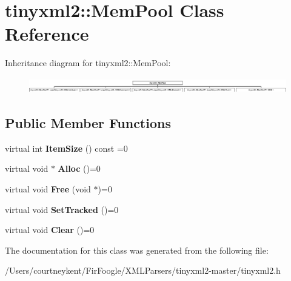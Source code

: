 \hypertarget{classtinyxml2_1_1_mem_pool}{\section{tinyxml2\+:\+:Mem\+Pool Class Reference}
\label{classtinyxml2_1_1_mem_pool}
}
Inheritance diagram for tinyxml2\+:\+:Mem\+Pool\+:\begin{figure}[H]
\begin{center}
\leavevmode
\includegraphics[height=0.691358cm]{classtinyxml2_1_1_mem_pool}
\end{center}
\end{figure}
\subsection*{Public Member Functions}
\begin{DoxyCompactItemize}
\item 
\hypertarget{classtinyxml2_1_1_mem_pool_a0c518d49e3a94bde566f61e13b7240bb}{virtual int {\bfseries Item\+Size} () const =0}\label{classtinyxml2_1_1_mem_pool_a0c518d49e3a94bde566f61e13b7240bb}

\item 
\hypertarget{classtinyxml2_1_1_mem_pool_a4f977b5fed752c0bbfe5295f469d6449}{virtual void $\ast$ {\bfseries Alloc} ()=0}\label{classtinyxml2_1_1_mem_pool_a4f977b5fed752c0bbfe5295f469d6449}

\item 
\hypertarget{classtinyxml2_1_1_mem_pool_a49e3bfac2cba2ebd6776b31e571f64f7}{virtual void {\bfseries Free} (void $\ast$)=0}\label{classtinyxml2_1_1_mem_pool_a49e3bfac2cba2ebd6776b31e571f64f7}

\item 
\hypertarget{classtinyxml2_1_1_mem_pool_ac5804dd1387b2e4de5eef710076a0db1}{virtual void {\bfseries Set\+Tracked} ()=0}\label{classtinyxml2_1_1_mem_pool_ac5804dd1387b2e4de5eef710076a0db1}

\item 
\hypertarget{classtinyxml2_1_1_mem_pool_a74fcdef9756917c8ae19fbbb4d658ed7}{virtual void {\bfseries Clear} ()=0}\label{classtinyxml2_1_1_mem_pool_a74fcdef9756917c8ae19fbbb4d658ed7}

\end{DoxyCompactItemize}


The documentation for this class was generated from the following file\+:\begin{DoxyCompactItemize}
\item 
/\+Users/courtneykent/\+Fir\+Foogle/\+X\+M\+L\+Parsers/tinyxml2-\/master/tinyxml2.\+h\end{DoxyCompactItemize}

